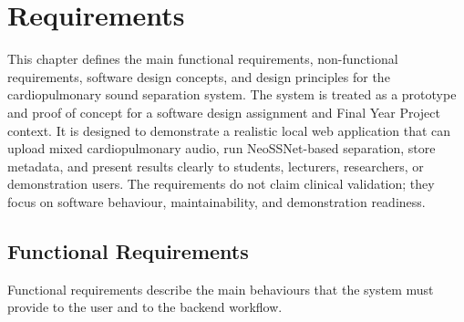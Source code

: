 \chapter{Requirements}

This chapter defines the main functional requirements, non-functional requirements, software design concepts, and design principles for the cardiopulmonary sound separation system. The system is treated as a prototype and proof of concept for a software design assignment and Final Year Project context. It is designed to demonstrate a realistic local web application that can upload mixed cardiopulmonary audio, run NeoSSNet-based separation, store metadata, and present results clearly to students, lecturers, researchers, or demonstration users. The requirements do not claim clinical validation; they focus on software behaviour, maintainability, and demonstration readiness.

\section{Functional Requirements}

Functional requirements describe the main behaviours that the system must provide to the user and to the backend workflow.

